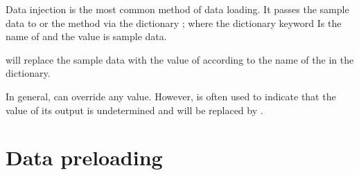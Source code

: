 \begin{content}

Data injection is the most common method of data loading. It passes the sample data to  or the  method via the dictionary ; where the dictionary keyword Is the name of  and the value is sample data.

 will replace the sample data with the value of  according to the name of the  in the dictionary.


In general,  can override any  value. However,  is often used to indicate that the value of its output  is undetermined and will be replaced by .

\end{content}

\section{Data preloading}

